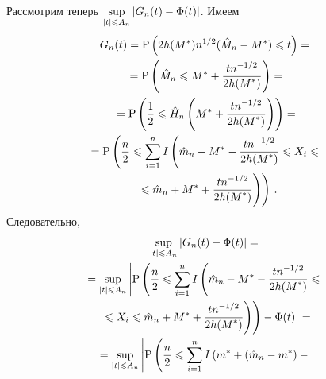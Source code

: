 \begin{multicols}{2}
Рассмотрим теперь $\sup\limits_{\abs{t}\leqslant A_n}\abs{G_n(t)\hm-\Phi(t)}$.
Имеем
\begin{multline*}
G_n(t)=\mbox{P}\left(2h(M^*)n^{1/2}(\hat{M}_n-M^*)\leqslant t\right)={}\\
{}=\mbox{P}\left(\hat{M}_n\leqslant M^*+\fr{tn^{-1/2}}{2h(M^*)}\right)={}\\
{}=\mbox{P}\left(\fr{1}{2}\leqslant\hat{H}_n\left(M^*+\fr{tn^{-1/2}}{2h(M^*)}\right)\right)={}\\
{}=\mbox{P}\left(\fr{n}{2}\leqslant\sum\limits_{i=1}^{n}
I\left(\hat{m}_n-M^*-\fr{tn^{-1/2}}{2h(M^*)}\leqslant X_i\leqslant{}\right.\right.\\
\left.\left.{}\leqslant \hat{m}_n+M^*+
\fr{tn^{-1/2}}{2h(M^*)}\right)\right)\,.
\end{multline*}
Следовательно,
\begin{multline*}
\sup\limits_{\abs{t}\leqslant A_n}\abs{G_n(t)-\Phi(t)}={}\\
{}=\sup\limits_{\abs{t}\leqslant A_n}\left\vert\mbox{P}\left(\fr{n}{2}\leqslant
\sum\limits_{i=1}^{n}
I\left(\hat{m}_n-M^*-\fr{tn^{-1/2}}{2h(M^*)}\leqslant{}\right.\right.\right.\\
\left.\left.\left.{}\leqslant X_i
\leqslant \hat{m}_n+M^*+\fr{tn^{-1/2}}{2h(M^*)}\right)\right)-\Phi(t)\right\vert={}\\
{}=\sup\limits_{\abs{t}\leqslant A_n}\left|\mbox{P}\left(\fr{n}{2}\leqslant\sum\limits_{i=1}^{n}
I\left(m^*+(\hat{m}_n-m^*)-{}\right.\right.\right.
\end{multline*}


\end{multicols}
